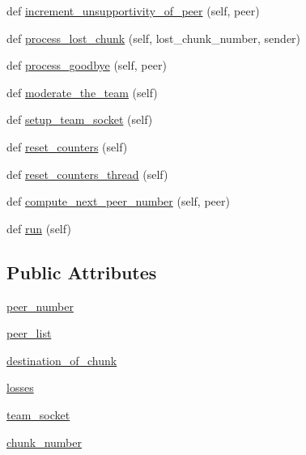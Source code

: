 \begin{DoxyCompactItemize}
\item 
def \hyperlink{classsrc_1_1core_1_1splitter__dbs_1_1Splitter__DBS_adefda40274ae5e75d57b67907ad03bb7}{increment\+\_\+unsupportivity\+\_\+of\+\_\+peer} (self, peer)
\item 
def \hyperlink{classsrc_1_1core_1_1splitter__dbs_1_1Splitter__DBS_acf0da7b0b7251915736377891ca0c12f}{process\+\_\+lost\+\_\+chunk} (self, lost\+\_\+chunk\+\_\+number, sender)
\item 
def \hyperlink{classsrc_1_1core_1_1splitter__dbs_1_1Splitter__DBS_aa21e8c9c535770b9ce138946849c4bf6}{process\+\_\+goodbye} (self, peer)
\item 
def \hyperlink{classsrc_1_1core_1_1splitter__dbs_1_1Splitter__DBS_a34d1a49ab596722417a528ff9d6c82f9}{moderate\+\_\+the\+\_\+team} (self)
\item 
def \hyperlink{classsrc_1_1core_1_1splitter__dbs_1_1Splitter__DBS_a305e32f518f64e76b8cb71cb4cbc9259}{setup\+\_\+team\+\_\+socket} (self)
\item 
def \hyperlink{classsrc_1_1core_1_1splitter__dbs_1_1Splitter__DBS_a7482a1adb2c1779f4187fb9550a4f4f4}{reset\+\_\+counters} (self)
\item 
def \hyperlink{classsrc_1_1core_1_1splitter__dbs_1_1Splitter__DBS_a34e493f0c70253f0a7566526d170655b}{reset\+\_\+counters\+\_\+thread} (self)
\item 
def \hyperlink{classsrc_1_1core_1_1splitter__dbs_1_1Splitter__DBS_a9bc2503fabf5e82372a2cd0ad7ca295e}{compute\+\_\+next\+\_\+peer\+\_\+number} (self, peer)
\item 
def \hyperlink{classsrc_1_1core_1_1splitter__dbs_1_1Splitter__DBS_a9ef9d1f2eb54fa6bc5fd2a5347d90787}{run} (self)
\end{DoxyCompactItemize}
\subsection*{Public Attributes}
\begin{DoxyCompactItemize}
\item 
\hyperlink{classsrc_1_1core_1_1splitter__dbs_1_1Splitter__DBS_a016cab7dccefdeb3ddfb8c39e34be195}{peer\+\_\+number}
\item 
\hyperlink{classsrc_1_1core_1_1splitter__dbs_1_1Splitter__DBS_a5b9e5b4e0fedea431b5b097794bd8e9a}{peer\+\_\+list}
\item 
\hyperlink{classsrc_1_1core_1_1splitter__dbs_1_1Splitter__DBS_ae679c86a9ae870b8968c11d49054f695}{destination\+\_\+of\+\_\+chunk}
\item 
\hyperlink{classsrc_1_1core_1_1splitter__dbs_1_1Splitter__DBS_a239a850a857f3b55d5aa4f49140d4e87}{losses}
\item 
\hyperlink{classsrc_1_1core_1_1splitter__dbs_1_1Splitter__DBS_acd50eb2fee3c9691cd631f4eb293d581}{team\+\_\+socket}
\item 
\hyperlink{classsrc_1_1core_1_1splitter__dbs_1_1Splitter__DBS_a482922e27a35771453628c3aa47ce7cd}{chunk\+\_\+number}
\end{DoxyCompactItemize}
